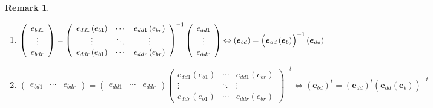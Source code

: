 \documentclass[aps,preprint]{revtex4}
\newtheorem{remark}[theorem]{Remark}
\begin{document}
\begin{remark}
\begin{enumerate}
\item 
\begin{equation}
\left( 
\begin{array}{c}
e_{bd1} \\ 
\vdots \\ 
e_{bdr}%
\end{array}%
\right) =\left( 
\begin{array}{ccc}
e_{dd1}\left( e_{b1}\right) & \cdots & e_{dd1}\left( e_{br}\right) \\ 
\vdots & \ddots & \vdots \\ 
e_{ddr}\left( e_{b1}\right) & \cdots & e_{ddr}\left( e_{br}\right)%
\end{array}%
\right) ^{-1}\left( 
\begin{array}{c}
e_{dd1} \\ 
\vdots \\ 
e_{ddr}%
\end{array}%
\right) \Leftrightarrow \left( \boldsymbol{e}_{bd}\right) =\left( \overset{}{%
\boldsymbol{e}_{dd}\left( \boldsymbol{e}_{b}\right) }\right) ^{-1}\left( 
\boldsymbol{e}_{dd}\right)
\end{equation}

\item 
\begin{equation}
\left( 
\begin{array}{ccc}
e_{bd1} & \cdots & e_{bdr}%
\end{array}%
\right) =\left( 
\begin{array}{ccc}
e_{dd1} & \cdots & e_{ddr}%
\end{array}%
\right) \left( 
\begin{array}{ccc}
e_{dd1}\left( e_{b1}\right) & \cdots & e_{dd1}\left( e_{br}\right) \\ 
\vdots & \ddots & \vdots \\ 
e_{ddr}\left( e_{b1}\right) & \cdots & e_{ddr}\left( e_{br}\right)%
\end{array}%
\right) ^{-t}\Leftrightarrow \left( \boldsymbol{e}_{bd}\right) ^{t}=\left( 
\boldsymbol{e}_{dd}\right) ^{t}\left( \overset{}{\boldsymbol{e}_{dd}\left( 
\boldsymbol{e}_{b}\right) }\right) ^{-t}
\end{equation}
\end{enumerate}
\end{remark}
\end{document}
